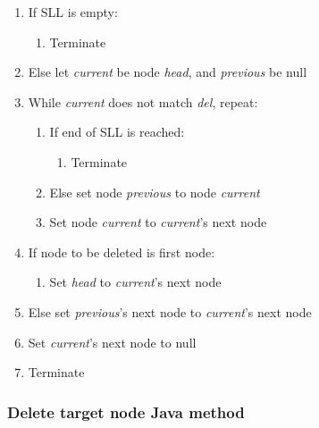 \begin{enumerate}
\item If SLL is empty:
	\begin{enumerate}
	\item Terminate
	\end{enumerate}
\item Else let \emph{current} be node \emph{head}, and \emph{previous} be null
\item While \emph{current} does not match \emph{del}, repeat:
	\begin{enumerate}
	\item If end of SLL is reached:
		\begin{enumerate}
		\item Terminate
		\end{enumerate}
	\item Else set node \emph{previous} to node \emph{current}
	\item Set node \emph{current} to \emph{current}'s next node
	\end{enumerate}
\item If node to be deleted is first node:
	\begin{enumerate}
	\item Set \emph{head} to \emph{current}'s next node
	\end{enumerate}
\item Else set \emph{previous}'s next node to \emph{current}'s next node
\item Set \emph{current}'s next node to null
\item Terminate
\end{enumerate}


\subsubsection{Delete target node Java method}

